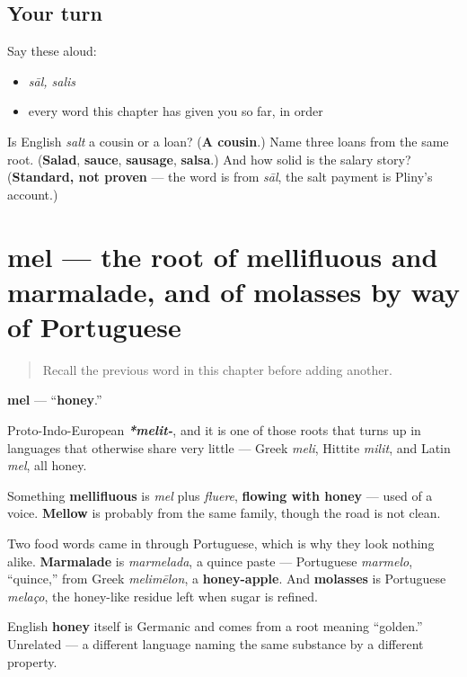 \subsection*{Your turn}
Say these aloud:

\begin{itemize}
\raggedright
  \item \emph{sāl, salis}
  \item every word this chapter has given you so far, in order
\end{itemize}

\begin{tcolorbox}[breakable,colback=teal!4,colframe=teal!35!black,title={Before you move on}]
Is English \emph{salt} a cousin or a loan? (\textbf{A cousin}.) Name three loans from the same root. (\textbf{Salad}, \textbf{sauce}, \textbf{sausage}, \textbf{salsa}.) And how solid is the salary story? (\textbf{Standard, not proven} — the word is from \emph{sāl}, the salt payment is Pliny's account.)
\end{tcolorbox}
\section[mel, mellis]{mel — the root of mellifluous and marmalade, and of molasses by way of Portuguese}

\label{lesson:LA-C47-mel}



\begin{quote}
Recall the previous word in this chapter before adding another.
\end{quote}

\begin{cousinweb}
\textbf{mel} — \textquotedblleft{}\textbf{honey}.\textquotedblright{}

Proto-Indo-European \emph{\textbf{*melit-}}, and it is one of those roots that turns up in languages that otherwise share very little — Greek \emph{meli}, Hittite \emph{milit}, and Latin \emph{mel}, all honey.

Something \textbf{mellifluous} is \emph{mel} plus \emph{fluere}, \textbf{flowing with honey} — used of a voice. \textbf{Mellow} is probably from the same family, though the road is not clean.

Two food words came in through Portuguese, which is why they look nothing alike. \textbf{Marmalade} is \emph{marmelada}, a quince paste — Portuguese \emph{marmelo}, \textquotedblleft{}quince,\textquotedblright{} from Greek \emph{melimēlon}, a \textbf{honey-apple}. And \textbf{molasses} is Portuguese \emph{melaço}, the honey-like residue left when sugar is refined.

English \textbf{honey} itself is Germanic and comes from a root meaning \textquotedblleft{}golden.\textquotedblright{} Unrelated — a different language naming the same substance by a different property.
\end{cousinweb}

